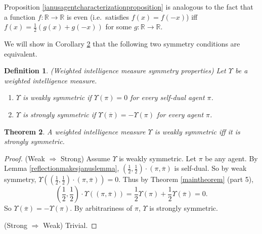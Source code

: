 \documentclass[twoside]{article}
\newtheorem{theorem}{Theorem}
\newtheorem{definition}[theorem]{Definition}
\begin{document}
Proposition \ref{janusagentcharacterizationproposition} is analogous to the
fact that a function $f:\mathbb R\to\mathbb R$ is even
(i.e.\ satisfies $f(x)=f(-x)$)
iff $f(x)=\frac12(g(x)+g(-x))$ for some $g:\mathbb R\to\mathbb R$.

We will show in Corollary \ref{equivalentsymmetriescor} that
the following two symmetry conditions are equivalent.

\begin{definition}
    (Weighted intelligence measure symmetry properties)
    Let $\Upsilon$ be a weighted intelligence measure.
    \begin{enumerate}
        \item $\Upsilon$ is \emph{weakly symmetric} if
            $\Upsilon(\pi)=0$ for every self-dual agent $\pi$.
        \item $\Upsilon$ is \emph{strongly symmetric} if
            $\Upsilon(\overline\pi)=-\Upsilon(\pi)$ for every agent $\pi$.
    \end{enumerate}
\end{definition}

\begin{theorem}
\label{equivalentsymmetriescor}
    A weighted intelligence measure $\Upsilon$ is weakly
    symmetric iff it is strongly symmetric.
\end{theorem}

\begin{proof}
    (Weak $\Rightarrow$ Strong)
    Assume $\Upsilon$ is weakly symmetric.
    Let $\pi$ be any agent.
    By Lemma \ref{reflectionmakesjanuslemma},
    $(\frac12,\frac12)\cdot(\pi,\overline\pi)$ is self-dual.
    So by weak symmetry,
    $\Upsilon((\frac12,\frac12)\cdot(\pi,\overline\pi))=0$.
    Thus by Theorem \ref{maintheorem} (part 5),
    \[
        (\mbox{$\frac12$},\mbox{$\frac12$})\cdot\Upsilon((\pi,\overline\pi))
        =\mbox{$\frac12$}\Upsilon(\pi)+\mbox{$\frac12$}\Upsilon(\overline\pi)=0.
    \]
    So $\Upsilon(\overline{\pi})=-\Upsilon(\pi)$.
    By arbitrariness of $\pi$, $\Upsilon$ is strongly symmetric.

    (Strong $\Rightarrow$ Weak)
    Trivial.
\end{proof}
\end{document}
